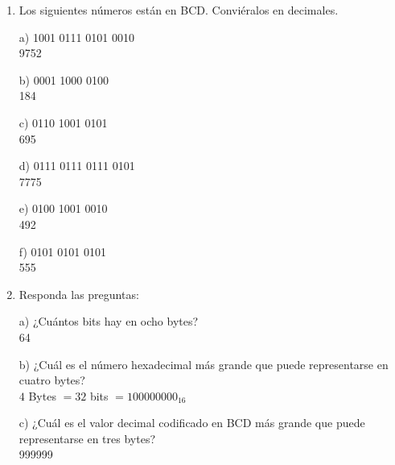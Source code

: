 \documentclass[a4paper, 12pt]{article}
\newcommand{\Aspace}{0.2cm}
\begin{document}
\begin{enumerate}
 
        \item Los siguientes números están en BCD. Conviéralos en decimales.
            \vspace{\Aspace} \par
            a) 1001 0111 0101 0010
            \\ { \color{azul} 9752 }

            \vspace{\Aspace} \par
            b) 0001 1000 0100
            \\ { \color{azul} 184 }

            \vspace{\Aspace} \par
            c) 0110 1001 0101
            \\ { \color{azul} 695 }

            \vspace{\Aspace} \par
            d) 0111 0111 0111 0101
            \\ { \color{azul} 7775 }

            \vspace{\Aspace} \par
            e) 0100 1001 0010
            \\ { \color{azul} 492 }

            \vspace{\Aspace} \par
            f) 0101 0101 0101
            \\ { \color{azul} 555 }


        \item Responda las preguntas:
            \vspace{\Aspace} \par
            a) ¿Cuántos bits hay en ocho bytes?
            \\ { \color{azul} 64 }

            \vspace{\Aspace} \par
            b) ¿Cuál es el número hexadecimal más grande que puede representarse en cuatro bytes?
            \\ { \color{azul} $4$ Bytes $= 32$ bits $= 100000000_{16}$}

            \vspace{\Aspace} \par
            c) ¿Cuál es el valor decimal codificado en BCD más grande que puede representarse en tres bytes?
            \\ { \color{azul} 999999 }



\end{enumerate}
\end{document}
